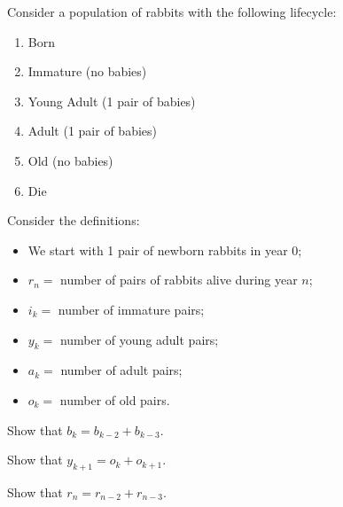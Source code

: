 \begin{minipage}{.45\textwidth}
\question \label{rabbitscomplicatedproof}
	Consider a population of rabbits with the following lifecycle:
	\begin{enumerate}[start=0,label=(year \arabic*)]
		\item Born
		\item Immature (no babies)
		\item Young Adult (1 pair of babies)
		\item Adult (1 pair of babies)
		\item Old (no babies)
		\item Die \\[5pt]
	\end{enumerate}	
	
\end{minipage}
\qquad
\begin{minipage}{.45\textwidth}
	Consider the definitions:
	\begin{itemize}
		\item We start with 1 pair of newborn rabbits in year 0;
		\item $r_n=$ number of pairs of rabbits alive during year $n$;
		\item $i_k=$ number of immature pairs;
		\item $y_k=$ number of young adult pairs;
		\item $a_k=$ number of adult pairs;
		\item $o_k=$ number of old pairs.
	\end{itemize}

\end{minipage}

	\begin{parts}
		\item Show that $b_k=b_{k-2}+b_{k-3}$.
		\item Show that $y_{k+1}=o_{k}+o_{k+1}$.
		\item Show that $r_{n} = r_{n-2}+r_{n-3}$.
	\end{parts}

